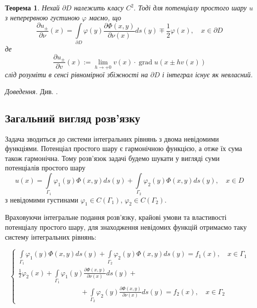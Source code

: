 \documentclass[14pt,a4paper]{extarticle}
\newcounter{e}
\newtheorem{theorem}{Теорема}[section]
\newcommand{\proof}{\textit{Доведення. \space}}
\numberwithin{equation}{section}
\newcommand{\intl}{\int\limits}
\begin{document}
 \begin{theorem}
 	 \label{potential-partial-derevative}
	 Нехай $\partial D$ належить класу $C^{2} .$ Тоді для потенціалу простого шару $u$ з неперервною густиною $\varphi$ маємо, що
	 $$
	 \frac{\partial u_{\pm}}{\partial \nu}(x) =
	 \intl_{\partial D} \varphi(y) \frac{\partial \Phi(x, y)}{\partial \nu(x)} d s(y) \mp \frac{1}{2} \varphi(x),
	 \quad x \in \partial D
	 $$
	 де
	 $$
	 \frac{\partial u_{\pm}}{\partial v}(x):=\lim _{h \rightarrow+0} v(x) \cdot \operatorname{grad} u(x \pm h v(x))
	 $$
	 слід розуміти в сенсі рівномірної збіжності на $\partial D$ і інтеграл існує як невласний.
 \end{theorem}
 \proof Див. \cite{kress2012linear}.
 
 \subsection{Загальний вигляд розв'язку}
 
 Задача \boundprob \space зводиться до системи інтегральних рівнянь з двома невідомими функціями.
 Потенціал простого шару є гармонічною функцією, а отже їх сума також гармонічна.
 Тому розв'язок задачі \boundprob \space будемо шукати у вигляді суми потенціалів простого шару
 \begin{equation}
	 \label{potentials-sum-solution}
	 u(x) 
	 = \intl_{\Gamma_1} \varphi_1(y) \Phi(x, y) d s(y)
	 + \intl_{\Gamma_2} \varphi_2(y) \Phi(x, y) d s(y)
	 , \quad x \in D
 \end{equation}
 з невідомими густинами $\varphi_1 \in C(\Gamma_{1}) $, $\varphi_2 \in C(\Gamma_{2})$.
 
 Враховуючи інтегральне подання розв'язку, крайові умови та властивості потенціалу простого шару, для знаходження невідомих функцій отримаємо таку систему інтегральних рівнянь:
 
 \begin{equation}
 	\label{IE-system}
	 \left\{
	 \begin{array}{l}
	 	\displaystyle
	 	  \intl_{\Gamma_{1}} \varphi_1(y) \Phi(x, y) d s(y)
	 	+ \intl_{\Gamma_{2}} \varphi_2(y) \Phi(x, y) d s(y)
	 	= f_{1}(x), \quad x \in \Gamma_{1} 
	 	\\ [1cm]
	 	\displaystyle
	 	\frac{1}{2}\varphi_2(x)
	 	+ \intl_{\Gamma_{1}} \varphi_1(y) \frac{\partial \Phi(x, y)}{\partial \nu(x)} d s(y) +
	 	\\ [0.3cm]
	 	\displaystyle \qquad \qquad \qquad \qquad \quad
	 	+ \intl_{\Gamma_{2}} \varphi_2(y) \frac{\partial \Phi(x, y)}{\partial \nu(x)} d s(y)
	 	= f_{2}(x), \quad x \in \Gamma_{2}
 \end{array}\right.
 \end{equation}
\end{document}
